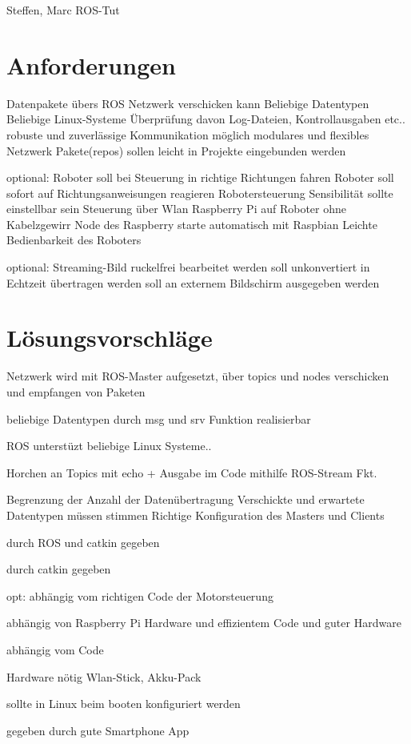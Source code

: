 \documentclass[12pt]{article}
\begin{document}
Steffen, Marc
ROS-Tut

\section{Anforderungen}

Datenpakete übers ROS Netzwerk verschicken kann
Beliebige Datentypen
Beliebige Linux-Systeme
Überprüfung davon Log-Dateien, Kontrollausgaben etc..
robuste und zuverlässige Kommunikation möglich
modulares und flexibles Netzwerk
Pakete(repos) sollen leicht in Projekte eingebunden werden

optional:
Roboter soll bei Steuerung in richtige Richtungen fahren
Roboter soll sofort auf Richtungsanweisungen reagieren
Robotersteuerung Sensibilität sollte einstellbar sein
Steuerung über Wlan
Raspberry Pi auf Roboter ohne Kabelzgewirr
Node des Raspberry starte automatisch mit Raspbian
Leichte Bedienbarkeit des Roboters

optional:
Streaming-Bild ruckelfrei bearbeitet werden
soll unkonvertiert in Echtzeit übertragen werden
soll an externem Bildschirm ausgegeben werden

\section{Lösungsvorschläge}

Netzwerk wird mit ROS-Master aufgesetzt, über topics und nodes
verschicken und empfangen von Paketen 

beliebige Datentypen durch msg und srv Funktion realisierbar

ROS unterstüzt beliebige Linux Systeme..

Horchen an Topics mit echo + Ausgabe im Code mithilfe ROS-Stream Fkt.

Begrenzung der Anzahl der Datenübertragung
Verschickte und erwartete Datentypen müssen stimmen
Richtige Konfiguration des Masters und Clients

durch ROS und catkin gegeben 

durch catkin gegeben

opt:
abhängig vom richtigen Code der Motorsteuerung

abhängig von Raspberry Pi Hardware und effizientem Code und
guter Hardware

abhängig vom Code

Hardware nötig Wlan-Stick, Akku-Pack 

sollte in Linux beim booten konfiguriert werden

gegeben durch gute Smartphone App
\end{document}
